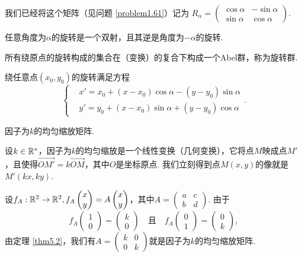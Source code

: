 我们已经将这个矩阵（见问题 \ref{problem1.61}）记为 $R_\alpha=\begin{pmatrix}
  \cos\alpha & -\sin\alpha \\
  \sin\alpha & \cos\alpha
\end{pmatrix}$.

任意角度为$\alpha$的旋转是一个双射，且其逆是角度为$-\alpha$的旋转.

所有绕原点的旋转构成的集合在（变换）的复合下构成一个Abel群，称为{\kaishu 旋转群.} 

\begin{mybox}
  绕任意点$(x_0,y_0)$的旋转满足方程
  \[
    \left\{
      \begin{aligned}
        & x' = x_0 + (x - x_0)\cos\alpha - (y - y_0)\sin \alpha \\
        & y' = y_0 + (x - x_0)\sin\alpha + (y - y_0)\cos\alpha
      \end{aligned}
    \right..
  \]
\end{mybox}

{\noindent \kaishu 因子为$k$的均匀缩放矩阵.}

设$k\in\mathbb R^\ast$，因子为$k$的均匀缩放是一个线性变换（几何变换），它将点$M$映成点$M'$，且使得$\overrightarrow{OM'}=k\overrightarrow{OM}$，其中$O$是坐标原点. 我们立刻得到点$M(x,y)$的像就是$M'(kx,ky)$.

设$f_A:\mathbb R^2\to\mathbb R^2,f_A\begin{pmatrix}
  x \\
  y
\end{pmatrix}=A\begin{pmatrix}
  x \\
  y
\end{pmatrix}$，其中$A=\begin{pmatrix}
  a & c \\
  b & d
\end{pmatrix}$. 由于
\[
  f_A \begin{pmatrix}
    1 \\
    0
  \end{pmatrix} =
  \begin{pmatrix}
    k \\
    0
  \end{pmatrix} \quad \text{且} \quad
  f_A\begin{pmatrix}
    0 \\
    1
  \end{pmatrix} =
  \begin{pmatrix}
    0 \\
    k
  \end{pmatrix},
\]
由定理 \ref{thm5.2}，我们有$A=\begin{pmatrix}
  k & 0 \\
  0 & k
\end{pmatrix}$就是因子为$k$的均匀缩放矩阵.

